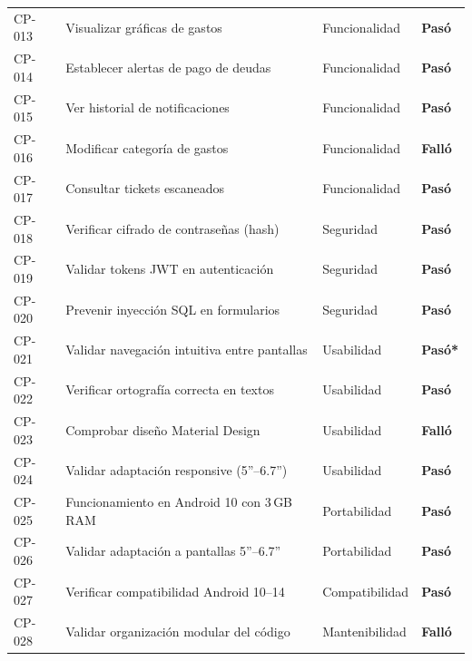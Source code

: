 \begin{longtable}{>{\small}p{1.3cm} >{\small}p{6.5cm} >{\small}p{3.2cm} >{\small}p{3.2cm}}
  CP-013 & Visualizar gráficas de gastos                & Funcionalidad  & \textcolor{OliveGreen}{\textbf{Pasó}}   \\[3pt]
  CP-014 & Establecer alertas de pago de deudas         & Funcionalidad  & \textcolor{OliveGreen}{\textbf{Pasó}}   \\[3pt]
  CP-015 & Ver historial de notificaciones              & Funcionalidad  & \textcolor{OliveGreen}{\textbf{Pasó}}   \\[3pt]
  CP-016 & Modificar categoría de gastos                & Funcionalidad  & \textcolor{BrickRed}{\textbf{Falló}}    \\[3pt]
  CP-017 & Consultar tickets escaneados                 & Funcionalidad  & \textcolor{OliveGreen}{\textbf{Pasó}}   \\[3pt]
  CP-018 & Verificar cifrado de contraseñas (hash)      & Seguridad      & \textcolor{OliveGreen}{\textbf{Pasó}}   \\[3pt]
  CP-019 & Validar tokens JWT en autenticación          & Seguridad      & \textcolor{OliveGreen}{\textbf{Pasó}}   \\[3pt]
  CP-020 & Prevenir inyección SQL en formularios        & Seguridad      & \textcolor{OliveGreen}{\textbf{Pasó}}   \\[3pt]
  CP-021 & Validar navegación intuitiva entre pantallas & Usabilidad     & \textcolor{BurntOrange}{\textbf{Pasó*}} \\[3pt]
  CP-022 & Verificar ortografía correcta en textos      & Usabilidad     & \textcolor{OliveGreen}{\textbf{Pasó}}   \\[3pt]
  CP-023 & Comprobar diseño Material Design             & Usabilidad     & \textcolor{BrickRed}{\textbf{Falló}}    \\[3pt]
  CP-024 & Validar adaptación responsive (5''--6.7'')   & Usabilidad     & \textcolor{OliveGreen}{\textbf{Pasó}}   \\[3pt]
  CP-025 & Funcionamiento en Android 10 con 3\,GB RAM  & Portabilidad   & \textcolor{OliveGreen}{\textbf{Pasó}}   \\[3pt]
  CP-026 & Validar adaptación a pantallas 5''--6.7''    & Portabilidad   & \textcolor{OliveGreen}{\textbf{Pasó}}   \\[3pt]
  CP-027 & Verificar compatibilidad Android 10--14      & Compatibilidad & \textcolor{OliveGreen}{\textbf{Pasó}}   \\[3pt]
  CP-028 & Validar organización modular del código      & Mantenibilidad & \textcolor{BrickRed}{\textbf{Falló}}    \\[3pt]

\end{longtable}
